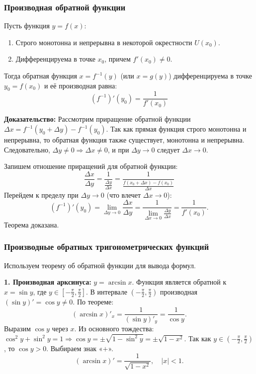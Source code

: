 \subsubsection*{Производная обратной функции}

\begin{tcolorbox}[title=Теорема (О производной обратной функции)]
    Пусть функция $y = f(x)$:
    \begin{enumerate}
        \item Строго монотонна и непрерывна в некоторой окрестности $U(x_0)$.
        \item Дифференцируема в точке $x_0$, причем $f'(x_0) \neq 0$.
    \end{enumerate}
    Тогда обратная функция $x = f^{-1}(y)$ (или $x = g(y)$) дифференцируема в точке $y_0 = f(x_0)$ и её производная равна:
    \[ (f^{-1})'(y_0) = \frac{1}{f'(x_0)} \]
\end{tcolorbox}

\textbf{Доказательство:}
Рассмотрим приращение обратной функции $\Delta x = f^{-1}(y_0 + \Delta y) - f^{-1}(y_0)$.
Так как прямая функция строго монотонна и непрерывна, то обратная функция также существует, монотонна и непрерывна. Следовательно, $\Delta y \neq 0 \Rightarrow \Delta x \neq 0$, и при $\Delta y \to 0$ следует $\Delta x \to 0$.

Запишем отношение приращений для обратной функции:
\[ \frac{\Delta x}{\Delta y} = \frac{1}{\frac{\Delta y}{\Delta x}} = \frac{1}{\frac{f(x_0+\Delta x) - f(x_0)}{\Delta x}} \]
Перейдем к пределу при $\Delta y \to 0$ (что влечет $\Delta x \to 0$):
\[ (f^{-1})'(y_0) = \lim_{\Delta y \to 0} \frac{\Delta x}{\Delta y} = \frac{1}{\lim_{\Delta x \to 0} \frac{\Delta y}{\Delta x}} = \frac{1}{f'(x_0)}. \]
Теорема доказана.

\subsubsection*{Производные обратных тригонометрических функций}

Используем теорему об обратной функции для вывода формул.

\textbf{1. Производная арксинуса:} $y = \arcsin x$.
Функция является обратной к $x = \sin y$, где $y \in [-\frac{\pi}{2}, \frac{\pi}{2}]$.
В интервале $(-\frac{\pi}{2}, \frac{\pi}{2})$ производная $(\sin y)' = \cos y \neq 0$.
По теореме:
\[ (\arcsin x)'_x = \frac{1}{(\sin y)'_y} = \frac{1}{\cos y}. \]
Выразим $\cos y$ через $x$. Из основного тождества: $\cos^2 y + \sin^2 y = 1 \Rightarrow \cos y = \pm \sqrt{1 - \sin^2 y} = \pm \sqrt{1 - x^2}$.
Так как $y \in (-\frac{\pi}{2}, \frac{\pi}{2})$, то $\cos y > 0$. Выбираем знак «$+$».
\[ (\arcsin x)' = \frac{1}{\sqrt{1 - x^2}}, \quad |x| < 1. \]

